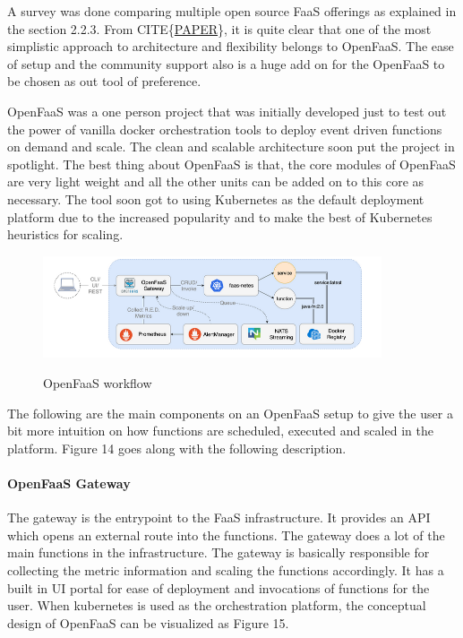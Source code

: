 \documentclass[12pt,titlepage]{article}
\begin{document}
A survey was done comparing multiple open source FaaS offerings as explained in
the section 2.2.3. From CITE\{\href{https://arxiv.org/pdf/1911.07449.pdf}{PAPER}\}, it is quite clear that one of the most
simplistic approach to architecture and flexibility belongs to OpenFaaS. The
ease of setup and the community support also is a huge add on for the OpenFaaS
to be chosen as out tool of preference.

OpenFaaS was a one person project that was initially developed just to test out
the power of vanilla docker orchestration tools to deploy event driven functions
on demand and scale. The clean and scalable architecture soon put the project in
spotlight. The best thing about OpenFaaS is that, the core modules of OpenFaaS
are very light weight and all the other units can be added on to this core as
necessary. The tool soon got to using Kubernetes as the default deployment
platform due to the increased popularity and to make the best of Kubernetes
heuristics for scaling.

\begin{figure}[!h]
    \caption{OpenFaaS workflow}
    \centering
    \includegraphics[width=100mm]{./thesis_images/openfaas_workflow.png}
    \label{fig:Openfaas workflow}
\end{figure}

The following are the main components on an OpenFaaS setup to give the user a
bit more intuition on how functions are scheduled, executed and scaled in the
platform. Figure 14 goes along with the following description.

\paragraph{OpenFaaS Gateway}
\label{sec:org716b591}
The gateway is the entrypoint to the FaaS infrastructure. It provides an API
which opens an external route into the functions. The gateway does a lot of the
main functions in the infrastructure. The gateway is basically responsible for
collecting the metric information and scaling the functions accordingly. It has
a built in UI portal for ease of deployment and invocations of functions for the
user. When kubernetes is used as the orchestration platform, the conceptual
design of OpenFaaS can be visualized as Figure 15.
\end{document}
